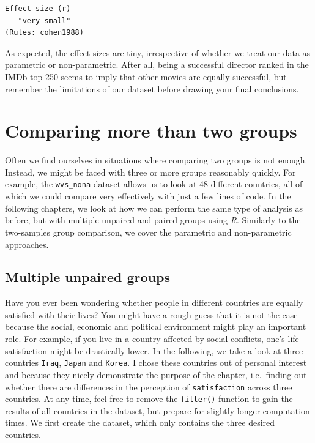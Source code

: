 \documentclass[
  letterpaper,
]{krantz}
\makeatletter
\newenvironment{Shaded}{\begin{snugshade}}{\end{snugshade}}
\newcommand{\AttributeTok}[1]{\textcolor[rgb]{0.40,0.45,0.13}{#1}}
\newcommand{\FunctionTok}[1]{\textcolor[rgb]{0.28,0.35,0.67}{#1}}
\newcommand{\NormalTok}[1]{\textcolor[rgb]{0.00,0.23,0.31}{#1}}
\newcommand{\SpecialCharTok}[1]{\textcolor[rgb]{0.37,0.37,0.37}{#1}}
\newcommand{\StringTok}[1]{\textcolor[rgb]{0.13,0.47,0.30}{#1}}
\newenvironment{kframe}{%
\medskip{}
\setlength{\fboxsep}{.8em}
 \def\at@end@of@kframe{}%
 \ifinner\ifhmode%
  \def\at@end@of@kframe{\end{minipage}}%
  \begin{minipage}{\columnwidth}%
 \fi\fi%
 \def\FrameCommand##1{\hskip\@totalleftmargin \hskip-\fboxsep
 \colorbox{shadecolor}{##1}\hskip-\fboxsep
     \hskip-\linewidth \hskip-\@totalleftmargin \hskip\columnwidth}%
 \MakeFramed {\advance\hsize-\width
   \@totalleftmargin\z@ \linewidth\hsize
   \@setminipage}}%
 {\par\unskip\endMakeFramed%
 \at@end@of@kframe}
\renewenvironment{Shaded}{\begin{kframe}}{\end{kframe}}
\makeatother
\begin{document}
\begin{Shaded}
\end{Shaded}

\begin{verbatim}
Effect size (r) 
   "very small" 
(Rules: cohen1988)
\end{verbatim}

As expected, the effect sizes are tiny, irrespective of whether we treat
our data as parametric or non-parametric. After all, being a successful
director ranked in the IMDb top 250 seems to imply that other movies are
equally successful, but remember the limitations of our dataset before
drawing your final conclusions.

\section{Comparing more than two
groups}\label{sec-comparing-more-than-two-groups}

Often we find ourselves in situations where comparing two groups is not
enough. Instead, we might be faced with three or more groups reasonably
quickly. For example, the \texttt{wvs\_nona} dataset allows us to look
at 48 different countries, all of which we could compare very
effectively with just a few lines of code. In the following chapters, we
look at how we can perform the same type of analysis as before, but with
multiple unpaired and paired groups using \emph{R}. Similarly to the
two-samples group comparison, we cover the parametric and non-parametric
approaches.

\subsection{Multiple unpaired
groups}\label{sec-multiple-unpaired-groups}

Have you ever been wondering whether people in different countries are
equally satisfied with their lives? You might have a rough guess that it
is not the case because the social, economic and political environment
might play an important role. For example, if you live in a country
affected by social conflicts, one's life satisfaction might be
drastically lower. In the following, we take a look at three countries
\texttt{Iraq}, \texttt{Japan} and \texttt{Korea}. I chose these
countries out of personal interest and because they nicely demonstrate
the purpose of the chapter, i.e.~finding out whether there are
differences in the perception of \texttt{satisfaction} across three
countries. At any time, feel free to remove the \texttt{filter()}
function to gain the results of all countries in the dataset, but
prepare for slightly longer computation times. We first create the
dataset, which only contains the three desired countries.
\end{document}

